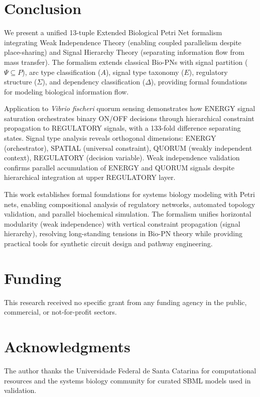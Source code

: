 \documentclass[twocolumn,11pt]{article}
\begin{document}
\section{Conclusion}

We present a unified 13-tuple Extended Biological Petri Net formalism integrating Weak Independence Theory (enabling coupled parallelism despite place-sharing) and Signal Hierarchy Theory (separating information flow from mass transfer). The formalism extends classical Bio-PNs with signal partition ($\Psi \subseteq P$), arc type classification ($A$), signal type taxonomy ($E$), regulatory structure ($\Sigma$), and dependency classification ($\Delta$), providing formal foundations for modeling biological information flow.

Application to \textit{Vibrio fischeri} quorum sensing demonstrates how ENERGY signal saturation orchestrates binary ON/OFF decisions through hierarchical constraint propagation to REGULATORY signals, with a 133-fold difference separating states. Signal type analysis reveals orthogonal dimensions: ENERGY (orchestrator), SPATIAL (universal constraint), QUORUM (weakly independent context), REGULATORY (decision variable). Weak independence validation confirms parallel accumulation of ENERGY and QUORUM signals despite hierarchical integration at upper REGULATORY layer.

This work establishes formal foundations for systems biology modeling with Petri nets, enabling compositional analysis of regulatory networks, automated topology validation, and parallel biochemical simulation. The formalism unifies horizontal modularity (weak independence) with vertical constraint propagation (signal hierarchy), resolving long-standing tensions in Bio-PN theory while providing practical tools for synthetic circuit design and pathway engineering.

\section*{Funding}

This research received no specific grant from any funding agency in the public, commercial, or not-for-profit sectors.

\section*{Acknowledgments}

The author thanks the Universidade Federal de Santa Catarina for computational resources and the systems biology community for curated SBML models used in validation.
\end{document}
